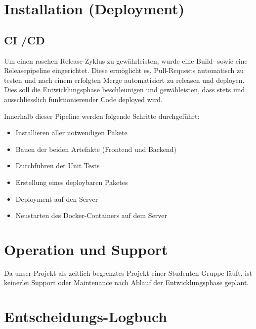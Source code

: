 \documentclass[a4paper, 11pt]{scrartcl}
\let\oldsection\section
\renewcommand\section{\clearpage\oldsection}
\begin{document}
\section{Installation (Deployment)}
\subsection{CI /CD}
Um einen raschen Release-Zyklus zu gewährleisten, wurde eine Build- sowie eine Releasepipeline eingerichtet.
Diese ermöglicht es, Pull-Requests automatisch zu testen und nach einem erfolgten Merge automatisiert zu releasen und deployen.
Dies soll die Entwicklungsphase beschleunigen und gewähleisten, dass stets und ausschliesslich funktionierender Code deployed wird.

Innerhalb dieser Pipeline werden folgende Schritte durchgeführt:
\begin{itemize}
  \item Installieren aller notwendigen Pakete
  \item Bauen der beiden Artefakte (Frontend und Backend)
  \item Durchführen der Unit Tests
  \item Erstellung eines deploybaren Paketes
  \item Deployment auf den Server
  \item Neustarten des Docker-Containers auf dem Server
\end{itemize}

\section{Operation und Support}

Da unser Projekt als zeitlich begrenztes Projekt einer Studenten-Gruppe läuft, ist keinerlei Support oder Maintenance nach Ablauf der Entwicklungsphase geplant.

\section{Entscheidungs-Logbuch}
\end{document}
